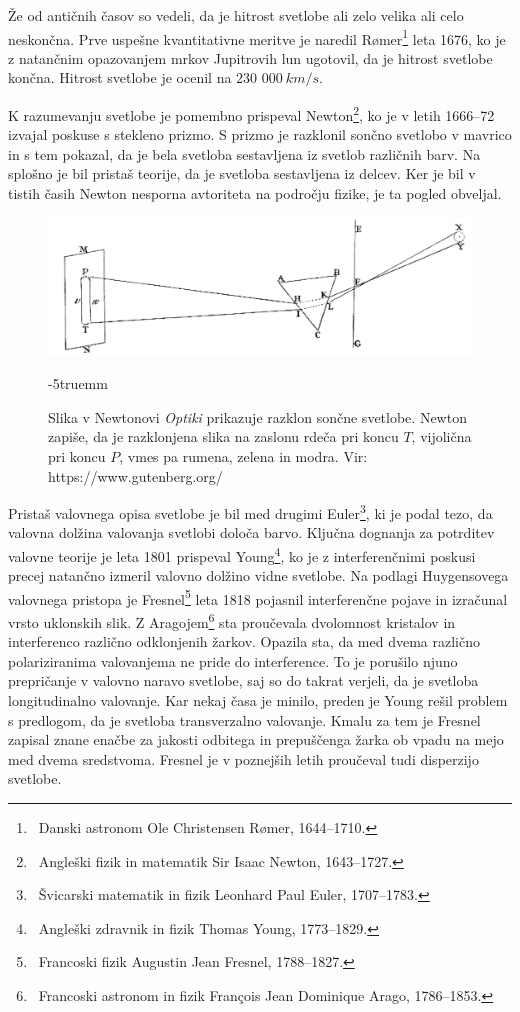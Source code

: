 Že od antičnih časov so vedeli, da
je hitrost svetlobe ali zelo velika ali celo neskončna. Prve uspešne kvantitativne
meritve je naredil R\o{}mer\footnote{~Danski astronom
Ole Christensen R\o{}mer, 1644--1710.} leta 1676, ko je z natančnim opazovanjem 
mrkov Jupitrovih lun ugotovil, da je hitrost svetlobe končna. Hitrost svetlobe je
ocenil na $230\,\,000~\si{km/s}$.

K razumevanju svetlobe je pomembno prispeval Newton\footnote{~Angleški 
fizik in matematik Sir Isaac Newton, 1643--1727.}, ko je v letih 1666--72 
izvajal poskuse s stekleno prizmo. S prizmo je razklonil sončno svetlobo v
mavrico in s tem pokazal, da je bela svetloba sestavljena 
iz svetlob različnih barv. Na splošno je bil pristaš teorije, da je 
svetloba sestavljena iz delcev. Ker je bil v tistih časih 
Newton nesporna avtoriteta na področju fizike, je ta pogled obveljal.
\begin{figure}[ht]
\centering
\includegraphics[width=10truecm]{slike/01_Newton.jpg}
\caption{Slika v Newtonovi {\it Optiki} prikazuje razklon sončne svetlobe. Newton 
zapiše, da je razklonjena slika na zaslonu rdeča pri koncu $T$, vijolična
pri koncu $P$, vmes pa rumena, zelena in modra. Vir: https://www.gutenberg.org/}
\label{fig:01_Newton}
\vglue-5truemm
\end{figure}

Pristaš valovnega opisa svetlobe je bil med drugimi Euler\footnote{~Švicarski 
matematik in fizik Leonhard Paul Euler, 1707--1783.}, ki je podal tezo, 
da valovna dolžina valovanja svetlobi določa barvo.
Ključna dognanja za potrditev valovne teorije je leta 1801 prispeval 
Young\footnote{~Angleški zdravnik in fizik Thomas Young, 1773--1829.}, 
ko je z interferenčnimi poskusi precej natančno izmeril valovno dolžino 
vidne svetlobe. Na podlagi Huygensovega valovnega pristopa je 
Fresnel\footnote{~Francoski fizik Augustin Jean Fresnel, 1788--1827.}
leta 1818 pojasnil interferenčne pojave in izračunal vrsto 
uklonskih slik. Z Aragojem\footnote{~Francoski astronom in fizik
Fran\c{c}ois Jean Dominique Arago, 1786--1853.} sta proučevala 
dvolomnost kristalov in interferenco različno odklonjenih žarkov. 
Opazila sta, da med dvema različno polariziranima valovanjema ne 
pride do interference. To je porušilo njuno prepričanje v valovno 
naravo svetlobe, saj so do takrat verjeli, da je svetloba
longitudinalno valovanje. Kar nekaj časa je minilo, preden je Young 
rešil problem s predlogom, da je svetloba transverzalno valovanje.
Kmalu za tem je Fresnel zapisal znane enačbe za jakosti odbitega 
in prepuščenga žarka ob vpadu na mejo med dvema sredstvoma.
Fresnel je v poznejših letih proučeval tudi disperzijo svetlobe.

